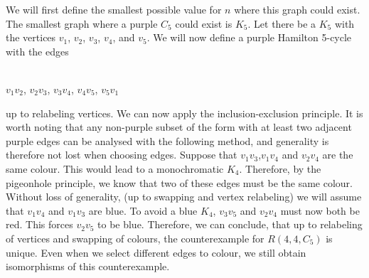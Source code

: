 \documentclass{article}
\begin{document}
We will first define the smallest possible value for $n$ where this graph could exist. The smallest graph where a purple $C_5$ could exist is $K_5$. Let there be a $K_5$ with the vertices $v_1$, $v_2$, $v_3$, $v_4$, and $v_5$. We will now define a purple Hamilton 5-cycle with the edges

\\\centering $v_1v_2$, $v_2v_3$, $v_3v_4$, $v_4v_5$, $v_5v_1$\\
\begin{flushleft}
up to relabeling vertices. We can now apply the inclusion-exclusion principle. It is worth noting that any non-purple subset of the form with at least two adjacent purple edges can be analysed with the following method, and generality is therefore not lost when choosing edges. Suppose that $v_1v_3$,$v_1v_4$ and $v_2v_4$ are the same colour. This would lead to a monochromatic $K_4$. Therefore, by the pigeonhole principle, we know that two of these edges must be the same colour. Without loss of generality, (up to swapping and vertex relabeling) we will assume that $v_1v_4$ and $v_1v_3$ are blue. To avoid a blue $K_4$, $v_3v_5$ and $v_2v_4$ must now both be red. This forces $v_2v_5$ to be blue. Therefore, we can conclude, that up to relabeling of vertices and swapping of colours, the counterexample for $R(4,4,C_5)$ is unique. Even when we select different edges to colour, we still obtain isomorphisms of this counterexample. 
\end{flushleft}
\end{document}

